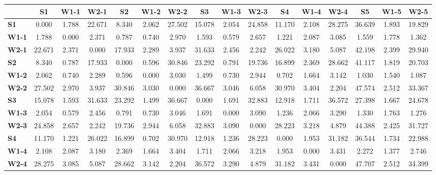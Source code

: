 \begin{table*}[h!]
\begin{center}
\begin{tabular}{| l || c | c | c || c | c | c || c | c | c || c | c | c || c | c | c |}\hline
 & {\bf S1} & {\bf W1-1} & {\bf W2-1} & {\bf S2} & {\bf W1-2} & {\bf W2-2} & {\bf S3} & {\bf W1-3} & {\bf W2-3} & {\bf S4} & {\bf W1-4} & {\bf W2-4} & {\bf S5} & {\bf W1-5} & {\bf W2-5} \\\hline\hline
{\bf S1} & 0.000 & 1.788 & 22.671 & 8.340 & 2.062 & 27.502 & 15.078 & 2.054 & 24.858 & 11.170 & 2.108 & 28.275 & 36.639 & 1.893 & 19.829 \\\hline
{\bf W1-1} & 1.788 & 0.000 & 2.371 & 0.787 & 0.740 & 2.970 & 1.593 & 0.579 & 2.657 & 1.221 & 2.087 & 3.085 & 1.559 & 1.778 & 1.362 \\\hline
{\bf W2-1} & 22.671 & 2.371 & 0.000 & 17.933 & 2.289 & 3.937 & 31.633 & 2.456 & 2.242 & 26.022 & 3.180 & 5.087 & 42.198 & 2.399 & 29.940 \\\hline\hline
{\bf S2} & 8.340 & 0.787 & 17.933 & 0.000 & 0.596 & 30.846 & 23.292 & 0.791 & 19.736 & 16.899 & 2.369 & 28.662 & 41.117 & 1.819 & 20.703 \\\hline
{\bf W1-2} & 2.062 & 0.740 & 2.289 & 0.596 & 0.000 & 3.030 & 1.499 & 0.730 & 2.944 & 0.702 & 1.664 & 3.142 & 1.030 & 1.540 & 1.087 \\\hline
{\bf W2-2} & 27.502 & 2.970 & 3.937 & 30.846 & 3.030 & 0.000 & 36.667 & 3.046 & 6.058 & 30.970 & 3.404 & 2.204 & 47.574 & 2.512 & 33.367 \\\hline\hline
{\bf S3} & 15.078 & 1.593 & 31.633 & 23.292 & 1.499 & 36.667 & 0.000 & 1.691 & 32.883 & 12.918 & 1.711 & 36.572 & 27.398 & 1.667 & 24.678 \\\hline
{\bf W1-3} & 2.054 & 0.579 & 2.456 & 0.791 & 0.730 & 3.046 & 1.691 & 0.000 & 3.090 & 1.236 & 2.066 & 3.290 & 1.330 & 1.763 & 1.276 \\\hline
{\bf W2-3} & 24.858 & 2.657 & 2.242 & 19.736 & 2.944 & 6.058 & 32.883 & 3.090 & 0.000 & 28.223 & 3.218 & 4.879 & 44.388 & 2.425 & 31.727 \\\hline\hline
{\bf S4} & 11.170 & 1.221 & 26.022 & 16.899 & 0.702 & 30.970 & 12.918 & 1.236 & 28.223 & 0.000 & 1.953 & 31.182 & 36.544 & 1.734 & 22.988 \\\hline
{\bf W1-4} & 2.108 & 2.087 & 3.180 & 2.369 & 1.664 & 3.404 & 1.711 & 2.066 & 3.218 & 1.953 & 0.000 & 3.431 & 2.272 & 1.377 & 2.746 \\\hline
{\bf W2-4} & 28.275 & 3.085 & 5.087 & 28.662 & 3.142 & 2.204 & 36.572 & 3.290 & 4.879 & 31.182 & 3.431 & 0.000 & 47.707 & 2.512 & 34.399 \\\hline\hline

\end{tabular}
\end{center}
\end{table*}
